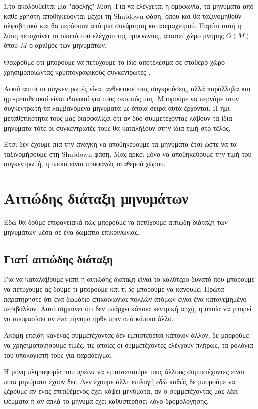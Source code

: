 Στο \cite{mpotr} ακολουθείται μια "αφελής" λύση.
Για να ελέγχεται η ομοφωνία, τα μηνύματα από κάθε χρήστη αποθηκεύονται μέχρι τη Shutdown φάση, όπου και θα ταξινομηθούν αλφαβητικά και θα περάσουν από μια συνάρτηση κατατεμαχισμού.
Παρότι αυτή η λύση πετυχαίνει το σκοπό του ελέγχου της ομοφωνίας, απαιτεί χώρο μνήμης $O(M)$ όπου $M$ ο αριθμός των μηνυμάτων.

Θεωρούμε ότι μπορούμε να πετύχουμε το ίδιο αποτέλεσμα σε σταθερό χώρο χρησιμοποιώντας κρυπτογραφικούς συγκεντρωτές \cite{accum_def}.

Αφού αυτοί οι συγκεντρωτές είναι ανθεκτικοί στις συγκρούσεις, αλλά παράλληλα και ημι-μεταθετικοί είναι ιδανικοί για τους σκοπούς μας. Μπορούμε να περνάμε στον συγκεντρωτή τα λαμβανόμενα μηνύματα με όποια σειρά αυτά έρχονται. Η ημι-μεταθετικότητά τους μας διασφαλίζει ότι αν δύο συμμετέχοντας λάβουν τα ίδια μηνύματα τότε οι συγκεντρωτές τους θα καταλήξουν στην ίδια τιμή στο τέλος.

Έτσι δεν έχουμε πια την ανάγκη να αποθηκεύουμε τα μηνύματα έτσι ώστε να τα ταξινομήσουμε στη Shutdown φάση. Μας αρκεί μόνο να αποθηκεύουμε την τιμή του συγκεντρωτή, η οποία είναι προφανώς σταθερού χώρου.

\section{Αιτιώδης διάταξη μηνυμάτων}

Εδώ θα δούμε επιφανειακά πώς μπορούμε να πετύχουμε αιτιώδη διάταξη των μηνυμάτων μέσα σε ένα δωμάτιο επικοινωνίας.

\subsection{Γιατί αιτιώδης διάταξη}

Για να καταλάβουμε γιατί η αιτιώδης διάταξη είναι το καλύτερο δυνατό που μπορούμε να πετύχουμε ας δούμε τι μπορούμε και τι δε μπορούμε να κάνουμε:
Πρώτα παρατηρήστε ότι ένα δωμάτιο επικοινωνίας πολλών ατόμων είναι ένα κατανεμημένο περιβάλλον.
Αυτό σημαίνει ότι δεν υπάρχει κάποια κεντρική αρχή, η οποία να μπορεί να αποφασίσει αν ένα μήνυμα ήρθε πριν από κάποιο άλλο.

Ακόμη επειδή κανένας συμμετέχοντας δεν εμπιστεύεται κάποιον άλλον, δε μπορούμε να χρησιμοποιήσουμε τιμές, τις οποίες οι συμμετέχοντες ελέγχουν πλήρως, τα ρολόγια του υπολογιστή τους για παράδειγμα.

Η μόνη πληροφορία που \emph{πρέπει} να εμπιστευτούμε τους άλλους συμμετέχοντες είναι ποια μηνύματα έχουν δει.
Δεν έχουμε άλλη επιλογή εδώ καθώς δε μπορούμε να ξέρουμε αν ένας επιτιθέμενος έχει κόψει μηνύματα, αν ο συμμετέχοντας μας λέει ψέμματα ή αν απλά το μήνυμα έχει καθυστερήσει λόγο δρομολόγησης.

